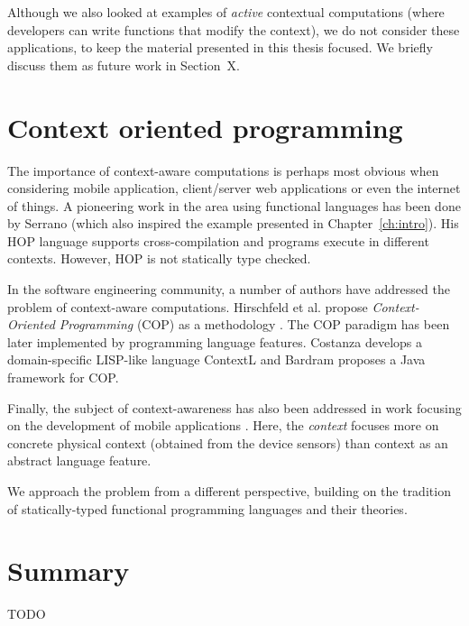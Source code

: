 Although we also looked at examples of \emph{active} contextual computations (where developers can
write functions that modify the context), we do not consider these applications, to keep the 
material presented in this thesis focused. We briefly discuss them as future work in Section~X.


\section{Context oriented programming}

The importance of context-aware computations is perhaps most obvious when considering mobile
application, client/server web applications or even the internet of things. A pioneering work
in the area using functional languages has been done by Serrano \cite{app-hop-diffuse,app-hop-lang}
(which also inspired the example presented in Chapter~\ref{ch:intro}). His HOP language supports 
cross-compilation and programs execute in different contexts. However, HOP is not statically 
type checked.

In the software engineering community, a number of authors have addressed the
problem of context-aware computations. Hirschfeld et al. propose \emph{Context-Oriented Programming} 
(COP) as a methodology \cite{app-cop-method}. The COP paradigm has been later implemented by
programming language features. Costanza \cite{app-cop-contextl} develops a domain-specific LISP-like 
language ContextL and Bardram \cite{app-cop-javafwk} proposes a Java framework for COP.

Finally, the subject of context-awareness has also been addressed in work focusing on the development 
of mobile applications \cite{app-cop-mobile,app-cop-mobile2}. Here, the \emph{context} focuses more 
on concrete physical context (obtained from the device sensors) than context as an abstract 
language feature.

We approach the problem from a different perspective, building on the tradition of 
statically-typed functional programming languages and their theories. 


\section{Summary}

TODO

% 
